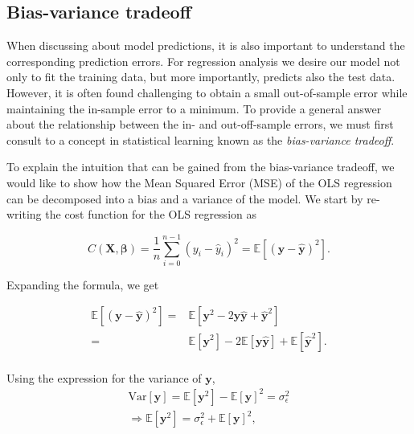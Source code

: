 \documentclass[a4paper]{article}
\begin{document}
\subsection{Bias-variance tradeoff}
When discussing about model predictions, it is also important to understand the corresponding prediction errors. For regression analysis we desire our model not only to fit the training data, but more importantly, predicts also the test data. However, it is often found challenging to obtain a small out-of-sample error while maintaining the in-sample error to a minimum. To provide a general answer about the relationship between the in- and out-off-sample errors, we must first consult to a concept in  statistical learning known as the \textit{bias-variance tradeoff}.

To explain the intuition that can be gained from the bias-variance tradeoff, we would like to show how the Mean Squared Error (MSE) of the OLS regression can be decomposed into a bias and a variance of the model. We start by re-writing the cost function for the OLS regression as 

\begin{equation}
    C(\mathbf{X},\boldsymbol{\beta}) 
    = \frac{1}{n}\sum_{i=0}^{n-1}(y_i-\hat{y}_i)^2 = \mathbb{E}[(\mathbf{y}-\mathbf{\hat{y}})^2].
    \label{cost_OLS_tradeoff} 
\end{equation}

Expanding the formula, we get

\begin{equation*}
    \begin{aligned}
    \mathbb{E}[	(\mathbf{y}-\mathbf{\hat{y}})^2] 
    =& \mathbb{E}[\mathbf{y}^2 -2\mathbf{y}\mathbf{\hat{y}}+ \mathbf{ \hat{y} } ^2 ] \\
    =& \mathbb{E}[\mathbf{y}^2] - 2\mathbb{E}[\mathbf{y\hat{y}}]+\mathbb{E}[\mathbf{\hat{y}}^2].\\
    \end{aligned}
    \label{auto2} 
\end{equation*}

Using the expression for the variance of $\mathbf{y}$,
\begin{equation*}
    \begin{aligned}
    \text{Var}[\mathbf{y}] = \mathbb{E}[\mathbf{y}^2] - \mathbb{E}[{\mathbf{y}}]^2 = \sigma_{\epsilon}^2\\
    \Rightarrow \mathbb{E}[\mathbf{y}^2] = \sigma_{\epsilon}^2 + \mathbb{E}[{\mathbf{y}}]^2,
    \end{aligned}
    \label{auto3}
\end{equation*}
\end{document}
